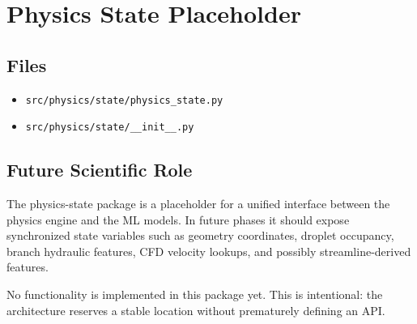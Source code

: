 \section{Physics State Placeholder}

\subsection{Files}

\begin{itemize}
  \item \texttt{src/physics/state/physics\_state.py}
  \item \texttt{src/physics/state/\_\_init\_\_.py}
\end{itemize}

\subsection{Future Scientific Role}

The physics-state package is a placeholder for a unified interface between the
physics engine and the ML models. In future phases it should expose synchronized
state variables such as geometry coordinates, droplet occupancy, branch
hydraulic features, CFD velocity lookups, and possibly streamline-derived
features.

No functionality is implemented in this package yet. This is intentional: the
architecture reserves a stable location without prematurely defining an API.
